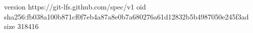 version https://git-lfs.github.com/spec/v1
oid sha256:fb038a100b871cf0f7eb4a87a8e0b7a680276a61d12832b5b4987050e245f3ad
size 318416

